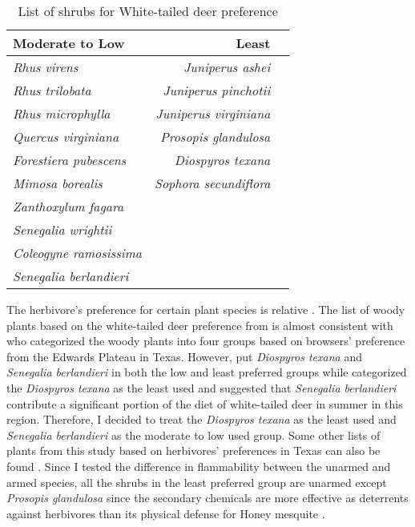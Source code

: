 \documentclass[12pt]{report}
\begin{document}
\begin{table}
    \centering
    \begin{tabular}{lrr}
     Moderate to Low & Least \\
     \hline
    \emph{Rhus virens} & \emph{Juniperus ashei} \\
    \emph{Rhus trilobata} & \emph{Juniperus pinchotii}\\
    \emph{Rhus microphylla} & \emph{Juniperus virginiana}\\
    \emph{Quercus virginiana} & \emph{Prosopis glandulosa}\\
    \emph{Forestiera pubescens} & \emph{Diospyros texana}\\
    \emph{Mimosa borealis} & \emph{Sophora secundiflora}\\
    \emph{Zanthoxylum fagara} &   \\
    \emph{Senegalia wrightii} & \\
    \emph{Coleogyne ramosissima} & \\
    \emph{Senegalia berlandieri} & \\
    \end{tabular}
    \caption{List of shrubs for White-tailed deer preference \citep*{wright2003white}}
\end{table}

The herbivore’s preference for certain plant species is relative \citep{wright2003white}. The list of woody plants based on the white-tailed deer preference from \citep{wright2003white} is almost consistent with \citep{nelle1996management} who categorized the woody plants into four groups based on browsers’ preference from the Edwards Plateau in Texas. However,  \citep{wright2003white} put \emph{Diospyros texana} and \emph{Senegalia berlandieri} in both the low and least preferred groups while \citep{nelle1996management} categorized the \emph{Diospyros texana} as the least used and \citep*{varner1987southern} suggested that \emph{Senegalia berlandieri} contribute a significant portion of the diet of white-tailed deer in summer in this region.  Therefore, I decided to treat the \emph{Diospyros texana} as the least used and \emph{Senegalia berlandieri} as the moderate to low used group. Some other lists of plants from this study based on herbivores’ preferences in Texas can also be found \citep{arnold1979seasonallist, nelle2001ecological, everitt1974springfoodhabit, dillard2006whitetaileddeer}. Since I tested the difference in flammability between the unarmed and armed species, all the shrubs in the least preferred group are unarmed except \emph{Prosopis glandulosa} since the secondary chemicals are more effective as deterrents against herbivores than its physical defense for Honey mesquite \citep{wright2003white}.
\end{document}
